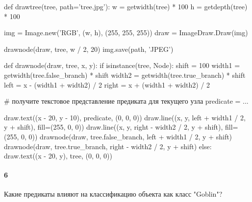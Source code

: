 \documentclass[a4paper,12pt]{article}
\begin{document}
\begin{python3}
def drawtree(tree, path='tree.jpg'):
    w = getwidth(tree) * 100
    h = getdepth(tree) * 100

    img = Image.new('RGB', (w, h), (255, 255, 255))
    draw = ImageDraw.Draw(img)

    drawnode(draw, tree, w / 2, 20)
    img.save(path, 'JPEG')

def drawnode(draw, tree, x, y):
    if isinstance(tree, Node):
        shift = 100
        width1 = getwidth(tree.false_branch) * shift
        width2 = getwidth(tree.true_branch) * shift
        left = x - (width1 + width2) / 2
        right = x + (width1 + width2) / 2

        # получите текстовое представление предиката для текущего узла
        predicate = ...
         
        draw.text((x - 20, y - 10), predicate, (0, 0, 0))
        draw.line((x, y, left + width1 / 2, y + shift), fill=(255, 0, 0))
        draw.line((x, y, right - width2 / 2, y + shift), fill=(255, 0, 0))
        drawnode(draw, tree.false_branch, left + width1 / 2, y + shift)
        drawnode(draw, tree.true_branch, right - width2 / 2, y + shift)        
    else:
        draw.text((x - 20, y), tree, (0, 0, 0))

\end{python3}

\paragraph{6} Какие предикаты влияют на классификацию объекта как класс "Goblin"?
\end{document}
